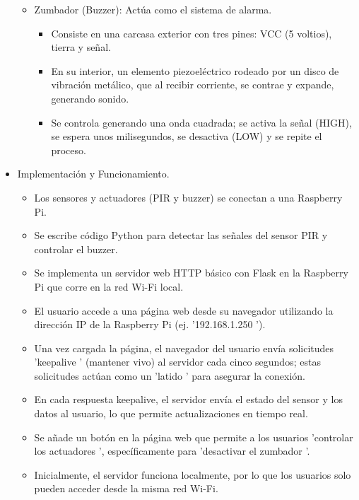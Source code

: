 \documentclass{report}
\begin{document}
\begin{itemize}
\begin{itemize}
\begin{itemize}
        \end{itemize}
        \item Zumbador (Buzzer): Actúa como el sistema de alarma.
        \begin{itemize}
            \item Consiste en una carcasa exterior con tres pines: VCC (5 voltios), tierra y señal.
            \item En su interior, un elemento piezoeléctrico rodeado por un disco de vibración metálico, que al recibir corriente, se contrae y expande, 
            generando sonido.
            \item Se controla generando una onda cuadrada; se activa la señal (HIGH), se espera unos milisegundos, se desactiva (LOW) y se repite el proceso.
        \end{itemize}
    \end{itemize}

\item Implementación y Funcionamiento.
    \begin{itemize}
        \item Los sensores y actuadores (PIR y buzzer) se conectan a una Raspberry Pi.
        \item Se escribe código Python para detectar las señales del sensor PIR y controlar el buzzer.
        \item Se implementa un servidor web HTTP básico con Flask en la Raspberry Pi que corre en la red Wi-Fi local.
        \item El usuario accede a una página web desde su navegador utilizando la dirección IP de la Raspberry Pi (ej.  '192.168.1.250 ').
        \item Una vez cargada la página, el navegador del usuario envía solicitudes  'keepalive ' (mantener vivo) al servidor cada cinco segundos; 
        estas solicitudes actúan como un  'latido ' para asegurar la conexión.
        \item En cada respuesta keepalive, el servidor envía el estado del sensor y los datos al usuario, lo que permite actualizaciones en tiempo real.
        \item Se añade un botón en la página web que permite a los usuarios  'controlar los actuadores ', específicamente para  'desactivar el zumbador '.
        \item Inicialmente, el servidor funciona localmente, por lo que los usuarios solo pueden acceder desde la misma red Wi-Fi.
    \end{itemize}


\end{itemize}
\end{document}
